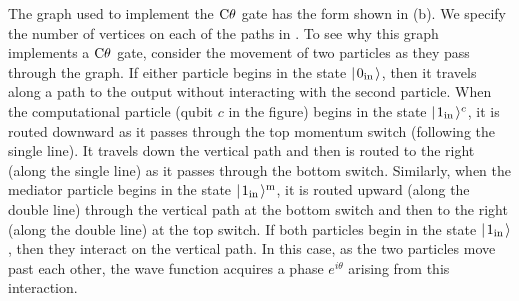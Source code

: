 \documentclass[../thesis-main/thesis-main]{subfiles}
\begin{document}
The graph used to implement the $\mathrm{C}\theta$ gate has the form shown in (b).  We specify the number of vertices on each of the paths in . To see why this graph implements a $\mathrm{C}\theta$ gate, consider the movement of two particles as they pass through the graph. If either particle begins in the state $|\mspace{2mu} 0_{\text{in}} \mspace{2mu} \rangle$, then it travels along a path to the output without interacting with the second particle. When the computational particle (qubit $c$ in the figure) begins in the state $|\mspace{2mu} 1_{\text{in}} \mspace{2mu} \rangle^c$, it is routed downward as it passes through the top momentum switch (following the single line). It travels down the vertical path and then is routed to the right (along the single line) as it passes through the bottom switch.  Similarly, when the mediator particle begins in the state $|\mspace{2mu} 1_{\text{in}} \mspace{2mu} \rangle^{\mathrm{m}}$, it is routed upward (along the double line) through the vertical path at the bottom switch and then to the right (along the double line) at the top switch. If both particles begin in the state $|\mspace{2mu} 1_{\text{in}} \mspace{2mu} \rangle$, then they interact on the vertical path. In this case, as the two particles move past each other, the wave function acquires a phase $e^{i\theta}$ arising from this interaction. 
\end{document}
